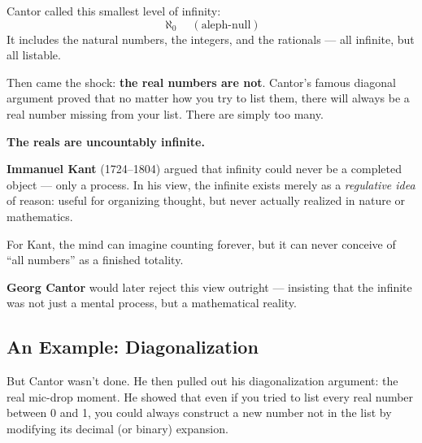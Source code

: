 \medskip

Cantor called this smallest level of infinity:
\[
\aleph_0 \quad (\text{aleph-null})
\]
It includes the natural numbers, the integers, and the rationals — all infinite, but all listable.

\medskip

Then came the shock: \textbf{the real numbers are not}.  
Cantor’s famous diagonal argument proved that no matter how you try to list them, there will always be a real number missing from your list. There are simply too many.

\textbf{The reals are uncountably infinite.}








\begin{tcolorbox}[colback=gray!5!white, colframe=black!80!white, title={Historical Sidebar: Kant and the Limits of Infinity}]

  \textbf{Immanuel Kant} (1724–1804) argued that infinity could never be a completed object — only a process. In his view, the infinite exists merely as a \textit{regulative idea} of reason: useful for organizing thought, but never actually realized in nature or mathematics.
  
  For Kant, the mind can imagine counting forever, but it can never conceive of “all numbers” as a finished totality.
  
  \medskip
  
  \textbf{Georg Cantor} would later reject this view outright — insisting that the infinite was not just a mental process, but a mathematical reality.
  
\end{tcolorbox}




  












\subsection{An Example: Diagonalization}

But Cantor wasn’t done. He then pulled out his diagonalization argument: the real mic-drop moment. He showed that even if you tried to list every real number between 0 and 1, you could always construct a new number not in the list by modifying its decimal (or binary) expansion.

